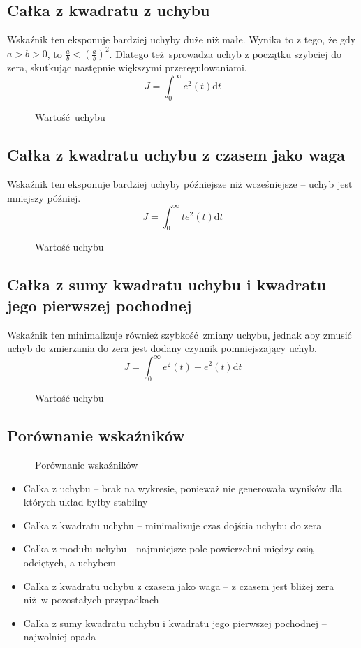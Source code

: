\documentclass[a4paper, 10pt]{article}
\begin{document}
		\subsection{Całka z kwadratu z uchybu}
			Wskaźnik ten eksponuje bardziej uchyby duże niż małe. Wynika to z tego, że gdy $a > b > 0$, to
			$\frac{a}{b} < \left(\frac{a}{b}\right)^2$. Dlatego też sprowadza uchyb z początku szybciej do zera, skutkując następnie większymi przeregulowaniami.
			$$
				J = \int_0^\infty
				e^2(t) \mathrm{d}t
			$$
			\begin{figure}[H]
				\centering
				\def \svgwidth{0.65\columnwidth}
				
				\caption{Wartość uchybu}
			\end{figure}\noindent
		\subsection{Całka z kwadratu uchybu z czasem jako waga}
			Wskaźnik ten eksponuje bardziej uchyby późniejsze niż wcześniejsze -- uchyb jest mniejszy później.
			$$
				J = \int_0^\infty
				te^2(t) \mathrm{d}t
			$$
			\begin{figure}[H]
				\centering
				\def \svgwidth{0.65\columnwidth}
				
				\caption{Wartość uchybu}
			\end{figure}\noindent
		\subsection{Całka z sumy kwadratu uchybu i kwadratu jego pierwszej pochodnej}
			Wskaźnik ten minimalizuje również szybkość zmiany uchybu, jednak aby zmusić uchyb do zmierzania do zera jest dodany czynnik pomniejszający uchyb.
			$$
				J = \int_0^\infty
				e^2(t) + \dot{e}^2(t)\mathrm{d}t
			$$
			\begin{figure}[H]
				\centering
				\def \svgwidth{0.65\columnwidth}
				
				\caption{Wartość uchybu}
			\end{figure}\noindent
		\subsection{Porównanie wskaźników}
			\begin{figure}[H]
				\centering
				\def \svgwidth{\columnwidth}
				
				\caption{Porównanie wskaźników}
			\end{figure}\noindent
			\begin{itemize}
				\item[] Całka z uchybu -- brak na wykresie, ponieważ nie generowała wyników dla których układ byłby stabilny
				\item[] Całka z kwadratu uchybu -- minimalizuje czas dojścia uchybu do zera
				\item[] Całka z modułu uchybu - najmniejsze pole powierzchni między osią odciętych, a uchybem
				\item[] Całka z kwadratu uchybu z czasem jako waga -- z czasem jest bliżej zera niż w pozostałych przypadkach
				\item[] Całka z sumy kwadratu uchybu i kwadratu jego pierwszej pochodnej -- najwolniej opada
			\end{itemize}
\end{document}
